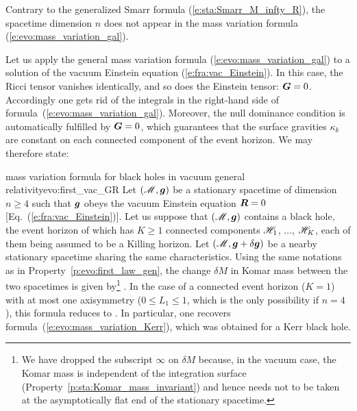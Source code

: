 \begin{remark}
Contrary to the generalized Smarr formula (\ref{e:sta:Smarr_M_infty_R}), the spacetime dimension $n$ does not appear in the mass variation
formula (\ref{e:evo:mass_variation_gal}).
\end{remark}

Let us apply the general mass variation formula (\ref{e:evo:mass_variation_gal})
to a solution of the vacuum Einstein equation (\ref{e:fra:vac_Einstein}).
In this case, the Ricci tensor vanishes identically, and so does the Einstein tensor: $\bm{G} = 0$.
Accordingly one gets rid of the integrals in the
right-hand side of formula~(\ref{e:evo:mass_variation_gal}). Moreover,
the null dominance condition is automatically fulfilled by $\bm{G}=0$,
which guarantees that the surface gravities
$\kappa_k$ are constant on each connected component of the event horizon. We may therefore state:

\begin{tprop}{mass variation formula for black holes in vacuum general relativity}{evo:first_vac_GR}
Let $(\mathscr{M},\bm{g})$ be a stationary spacetime of dimension $n\geq 4$ such that $\bm{g}$ obeys
the vacuum Einstein equation $\bm{R} = 0$ [Eq.~(\ref{e:fra:vac_Einstein})]. Let us
suppose that $(\mathscr{M},\bm{g})$ contains a black
hole, the event horizon of which has $K \geq 1$ connected components
$\mathscr{H}_{1}$, $\ldots$, $\mathscr{H}_{K}$, each of them being assumed to be a Killing horizon.
Let $(\mathscr{M},\bm{g}+\delta\bm{g})$ be a nearby stationary spacetime sharing the same characteristics.
Using the same notations as in Property~\ref{p:evo:first_law_gen}, the
change $\delta M$ in Komar mass between the two spacetimes
is given by\footnote{We have dropped the subscript $\infty$ on $\delta M$ because, in
the vacuum case, the Komar mass is independent of the integration surface
(Property~\ref{p:sta:Komar_mass_invariant}) and hence needs not to be taken at the asymptotically flat
end of the stationary spacetime.}
\be \label{e:evo:mass_variation_vacuum}
    .
\ee
In the case of a connected event horizon ($K=1$)
with at most one axisymmetry ($0 \leq L_1 \leq 1$, which is the only possibility if $n=4$),
this formula reduces to
\be \label{e:evo:mass_variation_vacuum_n4}
    .
\ee
In particular, one recovers formula~(\ref{e:evo:mass_variation_Kerr}), which was obtained
for a Kerr black hole.
\end{tprop}


